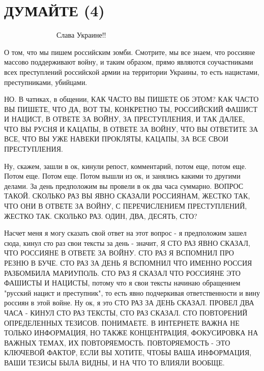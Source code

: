  
 
 
 
 

\section{ДУМАЙТЕ (4)}

💛 💙 💛 💙 💛 💙 💛 💙 💛 💙 💛 💙            
Слава Украине!! 

О том, что мы пишем российским зомби. Смотрите, мы все знаем, что россияне
массово поддерживают войну, и таким образом, прямо являются соучастниками всех
преступлений российской армии на территории Украины, то есть нацистами,
преступниками, убийцами.

НО. В чатиках, в общении, КАК ЧАСТО ВЫ ПИШЕТЕ ОБ ЭТОМ?  КАК ЧАСТО ВЫ ПИШЕТЕ,
ЧТО ДА, ВОТ ТЫ, КОНКРЕТНО ТЫ, РОССИЙСКИЙ ФАШИСТ И НАЦИСТ, В ОТВЕТЕ ЗА ВОЙНУ, ЗА
ПРЕСТУПЛЕНИЯ, И ТАК ДАЛЕЕ, ЧТО ВЫ РУСНЯ И КАЦАПЫ, В ОТВЕТЕ ЗА ВОЙНУ, ЧТО ВЫ
ОТВЕТИТЕ ЗА ВСЕ, ЧТО ВЫ УЖЕ НАВЕКИ ПРОКЛЯТЫ, КАЦАПЫ, ЗА ВСЕ СВОИ ПРЕСТУПЛЕНИЯ.

Ну, скажем, зашли в ок, кинули репост, комментарий, потом еще, потом еще.
Потом еще. Потом еще. Потом вышли из ок, и занялись какими то другими делами.
За день предположим вы провели в ок два часа суммарно. ВОПРОС ТАКОЙ. СКОЛЬКО
РАЗ ВЫ ЯВНО СКАЗАЛИ РОССИЯНАМ, ЖЕСТКО ТАК, ЧТО ОНИ В ОТВЕТЕ ЗА ВОЙНУ, С
ПЕРЕЧИСЛЕНИЕМ ПРЕСТУПЛЕНИЙ, ЖЕСТКО ТАК. СКОЛЬКО РАЗ. ОДИН, ДВА, ДЕСЯТЬ, СТО?

Насчет меня я могу сказать свой ответ на этот вопрос - я предположим зашел
сюда, кинул сто раз свои тексты за день - значит, Я СТО РАЗ ЯВНО СКАЗАЛ, ЧТО
РОССИЯНЕ В ОТВЕТЕ ЗА ВОЙНУ. СТО РАЗ Я ВСПОМНИЛ ПРО РЕЗНЮ В БУЧЕ. СТО РАЗ ЗА
ДЕНЬ Я ВСПОМНИЛ ЧТО ИМЕННО РОССИЯ РАЗБОМБИЛА МАРИУПОЛЬ. СТО РАЗ Я СКАЗАЛ ЧТО
РОССИЯНЕ ЭТО ФАШИСТЫ И НАЦИСТЫ, потому что я свои тексты начинаю обращением
"русский нацист и преступник", то есть явно подчеркивая ответственности и вину
россиян в этой войне. Ну ок, я это СТО РАЗ ЗА ДЕНЬ СКАЗАЛ. ПРОВЕЛ ДВА ЧАСА -
КИНУЛ СТО РАЗ ТЕКСТЫ, СТО РАЗ СКАЗАЛ.  СТО ПОВТОРЕНИЙ ОПРЕДЕЛЕННЫХ ТЕЗИСОВ.
ПОНИМАЕТЕ. В ИНТЕРНЕТЕ ВАЖНА НЕ ТОЛЬКО ИНФОРМАЦИЯ, НО ТАКЖЕ КОНЦЕНТРАЦИЯ,
ФОКУСИРОВКА НА ВАЖНЫХ ТЕМАХ, ИХ ПОВТОРЯЕМОСТЬ. ПОВТОРЯЕМОСТЬ - ЭТО КЛЮЧЕВОЙ
ФАКТОР, ЕСЛИ ВЫ ХОТИТЕ, ЧТОБЫ ВАША ИНФОРМАЦИЯ, ВАШИ ТЕЗИСЫ БЫЛА ВИДНЫ, И НА ЧТО
ТО ВЛИЯЛИ ВООБЩЕ.

